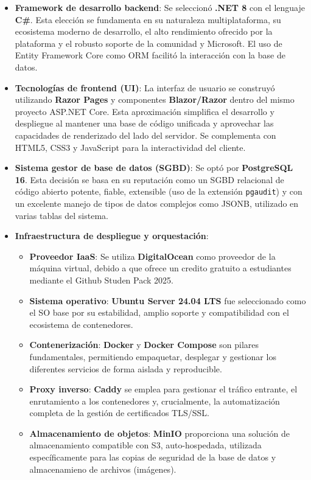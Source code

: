 \begin{itemize}
    \item \textbf{Framework de desarrollo backend}: Se seleccionó \textbf{.NET 8} con el lenguaje \textbf{C\#}. Esta elección se fundamenta en su naturaleza multiplataforma, su ecosistema moderno de desarrollo, el alto rendimiento ofrecido por la plataforma y el robusto soporte de la comunidad y Microsoft. El uso de Entity Framework Core como ORM facilitó la interacción con la base de datos.

    \item \textbf{Tecnologías de frontend (UI)}: La interfaz de usuario se construyó utilizando \textbf{Razor Pages} y componentes \textbf{Blazor/Razor} dentro del mismo proyecto ASP.NET Core. Esta aproximación simplifica el desarrollo y despliegue al mantener una base de código unificada y aprovechar las capacidades de renderizado del lado del servidor. Se complementa con HTML5, CSS3 y JavaScript para la interactividad del cliente.

    \item \textbf{Sistema gestor de base de datos (SGBD)}: Se optó por \textbf{PostgreSQL 16}. Esta decisión se basa en su reputación como un SGBD relacional de código abierto potente, fiable, extensible (uso de la extensión \texttt{pgaudit}) y con un excelente manejo de tipos de datos complejos como JSONB, utilizado en varias tablas del sistema.

    \item \textbf{Infraestructura de despliegue y orquestación}:
        \begin{itemize}
            \item \textbf{Proveedor IaaS}: Se utiliza \textbf{DigitalOcean} como proveedor de la máquina virtual, debido a que ofrece un credito gratuito a estudiantes mediante el Github Studen Pack 2025.
            \item \textbf{Sistema operativo}: \textbf{Ubuntu Server 24.04 LTS} fue seleccionado como el SO base por su estabilidad, amplio soporte y compatibilidad con el ecosistema de contenedores.
            \item \textbf{Contenerización}: \textbf{Docker} y \textbf{Docker Compose} son pilares fundamentales, permitiendo empaquetar, desplegar y gestionar los diferentes servicios de forma aislada y reproducible.
            \item \textbf{Proxy inverso}: \textbf{Caddy} se emplea para gestionar el tráfico entrante, el enrutamiento a los contenedores y, crucialmente, la automatización completa de la gestión de certificados TLS/SSL.
            \item \textbf{Almacenamiento de objetos}: \textbf{MinIO} proporciona una solución de almacenamiento compatible con S3, auto-hospedada, utilizada específicamente para las copias de seguridad de la base de datos y almacenamieno de archivos (imágenes).
        \end{itemize}


\end{itemize}
